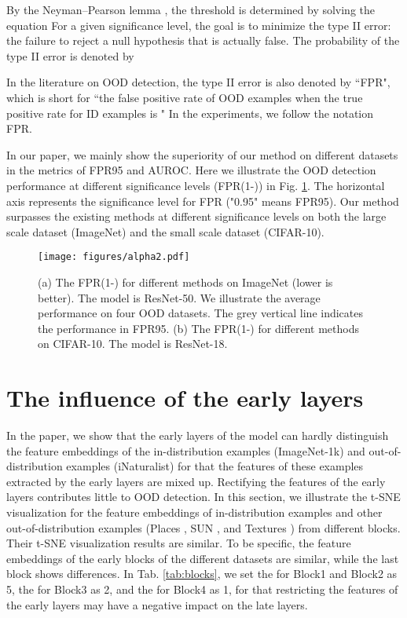 \documentclass{article}
\begin{document}
By the Neyman–Pearson lemma \cite{neyman1933ix}, the threshold  is determined by solving the equation 
For a given significance level, the goal is to minimize the type II error: the failure to reject a null hypothesis that is actually false. The probability of the type II error is denoted by

In the literature on OOD detection, the type II error is also denoted by ``FPR", which is short for ``the false positive rate of OOD examples when the true positive rate for ID examples is " In the experiments, we follow the notation FPR. 

In our paper, we mainly show the superiority of our method on different datasets in the metrics of FPR95 and AUROC. Here we illustrate the OOD detection performance at different significance levels (FPR(1-)) in Fig. \ref{img:alpha}. The horizontal axis represents the significance level for FPR ("0.95" means FPR95). Our method surpasses the existing methods at different significance levels on both the large scale dataset (ImageNet) and the small scale dataset (CIFAR-10).
\begin{figure}[htbp]
\centering
\texttt{[image: figures/alpha2.pdf]}
\caption{(a) The FPR(1-) for different methods on ImageNet (lower is better). The model is ResNet-50. We illustrate the average performance on four OOD datasets. The grey vertical line indicates the performance in FPR95. (b) The FPR(1-) for different methods on CIFAR-10. The model is ResNet-18.}
\label{img:alpha}
\end{figure}



\section{The influence of the early layers}\label{App:early}
In the paper, we show that the early layers of the model can hardly distinguish the feature embeddings of the in-distribution examples (ImageNet-1k) and out-of-distribution examples (iNaturalist) for that the features of these examples extracted by the early layers are mixed up. Rectifying the features of the early layers contributes little to OOD detection.
In this section, we illustrate the t-SNE visualization for the feature embeddings of in-distribution examples and other out-of-distribution examples (Places \cite{zhou2017places}, SUN \cite{xiao2010sun}, and Textures \cite{cimpoi2014Texture}) from different blocks. Their t-SNE visualization results are similar. To be specific, the feature embeddings of the early blocks of the different datasets are similar, while the last block shows differences. In Tab. \ref{tab:blocks}, we set the  for Block1 and Block2 as 5, the  for Block3 as 2, and the  for Block4 as 1, for that restricting the features of the early layers may have a negative impact on the late layers.
\end{document}

